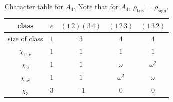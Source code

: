 \documentclass[12pt]{article}
\theoremstyle{definition}
\begin{document}
\begin{table}[H]
    \centering
    \begin{tabular}{|| c || c | c | c | c ||}
        \hline
        class & $e$ & $(1\,2)(3\,4)$ & $(1\,2\,3)$ & $(1\,3\,2)$ \\
        \hline
        size of class & $1$ & $3$ & $4$ & $4$ \\
        \hline 
        $\chi_{\text{triv}}$ & $1$ & $1$ & $1$ & $1$ \\
        $\chi_{\omega}$ & $1$ & $1$ & $\omega$ & $\omega^2$ \\
        $\chi_{\omega^2}$ & $1$ & $1$ & $\omega^2$ & $\omega$ \\
        $\chi_{3}$ & $3$ & $-1$ & $0$ & $0$ \\
        \hline
    \end{tabular}
    \caption{Character table for $A_4$. Note that for $A_4$, $\rho_{\text{triv}} = \rho_{\text{sign}}$.}
    \label{tab:Table7}
\end{table}
\end{document}
